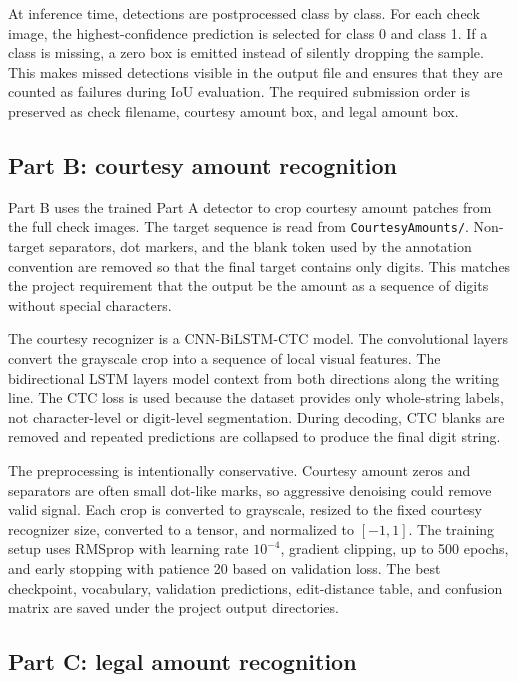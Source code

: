 \documentclass{article}
\begin{document}
At inference time, detections are postprocessed class by class. For each check image, the highest-confidence prediction is selected for class 0 and class 1. If a class is missing, a zero box is emitted instead of silently dropping the sample. This makes missed detections visible in the output file and ensures that they are counted as failures during IoU evaluation. The required submission order is preserved as check filename, courtesy amount box, and legal amount box.

\subsection{Part B: courtesy amount recognition}

Part B uses the trained Part A detector to crop courtesy amount patches from the full check images. The target sequence is read from \texttt{CourtesyAmounts/}. Non-target separators, dot markers, and the blank token used by the annotation convention are removed so that the final target contains only digits. This matches the project requirement that the output be the amount as a sequence of digits without special characters.

The courtesy recognizer is a CNN-BiLSTM-CTC model. The convolutional layers convert the grayscale crop into a sequence of local visual features. The bidirectional LSTM layers model context from both directions along the writing line. The CTC loss is used because the dataset provides only whole-string labels, not character-level or digit-level segmentation. During decoding, CTC blanks are removed and repeated predictions are collapsed to produce the final digit string.

The preprocessing is intentionally conservative. Courtesy amount zeros and separators are often small dot-like marks, so aggressive denoising could remove valid signal. Each crop is converted to grayscale, resized to the fixed courtesy recognizer size, converted to a tensor, and normalized to \([-1,1]\). The training setup uses RMSprop with learning rate \(10^{-4}\), gradient clipping, up to 500 epochs, and early stopping with patience 20 based on validation loss. The best checkpoint, vocabulary, validation predictions, edit-distance table, and confusion matrix are saved under the project output directories.

\subsection{Part C: legal amount recognition}
\end{document}
